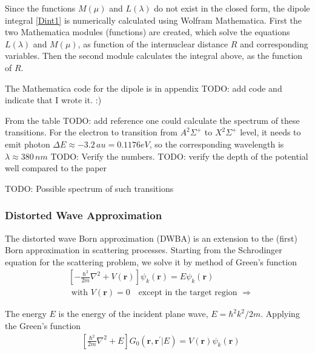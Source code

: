 Since the functions $ M(\mu)$ and $L(\lambda) $ do not exist in the closed form, the dipole integral \eqref{Dint1}  is numerically calculated using Wolfram Mathematica.  First the two Mathematica modules (functions) are created, which solve the equations $ L(\lambda) $ and $ M(\mu) $, as function of the internuclear distance $ R $ and corresponding variables. Then the second module calculates the integral above,  as the function of $ R $.

The Mathematica code for the dipole is in appendix TODO: add code and indicate that I wrote it. :)

From the table TODO: add reference one could calculate the spectrum of these transitions.  For the electron to transition from $ A^2\Sigma^{+} $ to $ X^2\Sigma^{+} $ level, it needs to emit photon $ \Delta E \approx  -3.2\,au = 0.1176 eV $, so the corresponding wavelength is $ \lambda \approx   380\,nm $  TODO: Verify the numbers.
TODO: verify the depth of the potential well compared to the paper \cite{H2Plus2d1}

TODO: Possible spectrum of such transitions

\subsubsection{Distorted Wave Approximation}

The distorted wave Born approximation (DWBA) is an extension to the (first) Born approximation in scattering processes. Starting from the Schrodinger equation for the scattering problem, we solve it by method of Green's function
\begin{equation}
\begin{split}
& \left[-\frac{\hbar^2}{2m}\nabla^2 + V(\mathbf{r})\right]\psi_k(\mathbf{r}) = E \psi_k(\mathbf{r}) \\[.8em]
& \text{ with } V(\mathbf{r}) = 0 \,\,\,\,\text{ except in the target region }  \Longrightarrow
\end{split}
\end{equation}

The energy $ E $ is the energy of the incident plane wave, $ E = \hbar^2k^2/2m $.  Applying the Green's function
\begin{equation}
\begin{split}
& \left[\frac{\hbar^2}{2m}\nabla^2 + E \right]G_0(\mathbf{r}, \mathbf{r}^{'} | E) = V(\mathbf{r}) \psi_k(\mathbf{r}) 
\end{split}
\end{equation}

